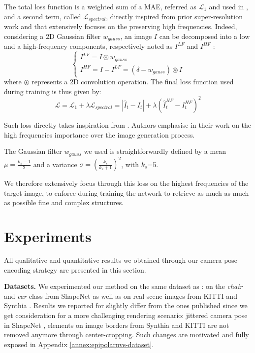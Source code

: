 The total loss function is a weighted sum  of a \ac{MAE}, referred as $\mathcal{L}_{1}$ and used in \citep{kim2020novel}, and a second term, called $\mathcal{L}_{spectral}$, directly inspired from prior super-resolution work \citep{fritsche2019frequency} and that extensively focuses on the preserving high frequencies. Indeed, considering a 2D Gaussian filter $w_{gauss}$, an image $I$ can be decomposed into a low and a high-frequency components, respectively noted as $I^{LF}$ and $I^{HF}$ : 
\begin{equation}
\begin{cases}
     I^{LF}  = I\circledast w_{gauss} \\
     I^{HF} = I - I^{LF} = (\delta - w_{gauss})\circledast I
\end{cases}
\end{equation}
where $\circledast$ represents a 2D convolution operation. 
The final loss function used during training is thus given by: 
\begin{equation}
    \mathcal{L} = \mathcal{L}_{1} + \lambda \mathcal{L}_{spectral} = |\hat{I}_{t} - I_{t}| + \lambda \left( \hat{I}_{t}^{HF} - I_{t}^{HF} \right)^{2}
    \label{eq:1}
\end{equation}


Such loss directly takes inspiration from \citep{fritsche2019frequency}. Authors emphasise in their work on the high frequencies importance over the image generation process. \newline

The Gaussian filter $w_{gauss}$ we used is straightforwardly defined by a mean $\mu = \frac{k_{s}-1}{2}$ and a variance $\sigma = (\frac{k_{s}}{k_{s}+1})^{2}$, with $k_{s}$=5.

We therefore extensively focus through this loss on the highest frequencies of the target image, to enforce during training the network to retrieve as much as much as possible fine and complex structures. 

\section{Experiments}
All qualitative and quantitative results we obtained through our camera pose encoding strategy are presented in this section. \newline

\noindent\textbf{Datasets.} We experimented our method on the same dataset as \citep{kim2020novel, sun2018multiview}: on the \textit{chair} and \textit{car} class from ShapeNet \citep{chang2015shapenet} as well as on real scene images from KITTI \citep{geiger2012we} and Synthia \citep{ros2016synthia}.
Results we reported for \citep{kim2020novel} slightly differ from the ones published since we get consideration for a more challenging rendering scenario: jittered camera pose in ShapeNet \citep{chang2015shapenet}, elements on image borders from Synthia \citep{ros2016synthia} and KITTI \citep{geiger2012we} are not removed anymore through  center-cropping. Such changes are motivated and fully exposed in Appendix \ref{annex:epipolarnvs-dataset}.  \newline

